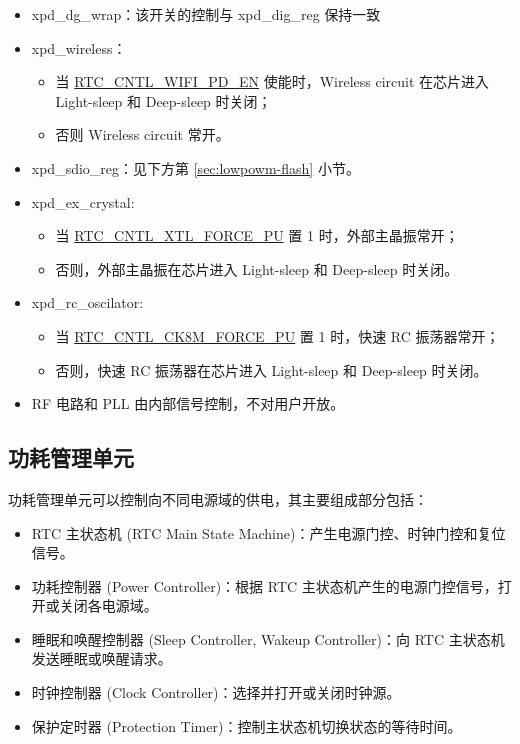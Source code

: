 \documentclass[main\_\_CN.tex]{subfiles}
\begin{document}
\begin{itemize}
\begin{itemize}
        \item xpd\_dg\_wrap：该开关的控制与 xpd\_dig\_reg 保持一致

        \item xpd\_wireless：
        \begin{itemize}
            \item 当 \hyperref[fielddesc:RTCCNTLDGWRAPPDEN]{RTC\_CNTL\_WIFI\_PD\_EN} 使能时，Wireless circuit 在芯片进入 Light-sleep 和 Deep-sleep 时关闭；
            \item 否则 Wireless circuit 常开。
        \end{itemize}

        \item xpd\_sdio\_reg：见下方第 \ref{sec:lowpowm-flash} 小节。
         \item xpd\_ex\_crystal:
        \begin{itemize}
            \item 当 \hyperref[fielddesc:RTCCNTLXTLFORCEPU]{RTC\_CNTL\_XTL\_FORCE\_PU} 置 1 时，外部主晶振常开；
            \item 否则，外部主晶振在芯片进入 Light-sleep 和 Deep-sleep 时关闭。
        \end{itemize}
        \item xpd\_rc\_oscilator:
        \begin{itemize}
            \item 当 \hyperref[fielddesc:RTCCNTLCK8MFORCEPU]{RTC\_CNTL\_CK8M\_FORCE\_PU} 置 1 时，快速 RC 振荡器常开；
            \item 否则，快速 RC 振荡器在芯片进入 Light-sleep 和 Deep-sleep 时关闭。
        \end{itemize}
        \item RF 电路和 PLL 由内部信号控制，不对用户开放。
        \end{itemize}
\end{itemize}

\subsection{功耗管理单元}
\chipname{} 功耗管理单元可以控制向不同电源域的供电，其主要组成部分包括：

\begin{itemize}
\item RTC 主状态机 (RTC Main State Machine)：产生电源门控、时钟门控和复位信号。
\item 功耗控制器 (Power Controller)：根据 RTC 主状态机产生的电源门控信号，打开或关闭各电源域。
\item 睡眠和唤醒控制器 (Sleep Controller, Wakeup Controller)：向 RTC 主状态机发送睡眠或唤醒请求。
\item 时钟控制器 (Clock Controller)：选择并打开或关闭时钟源。
\item 保护定时器 (Protection Timer)：控制主状态机切换状态的等待时间。
\end{itemize}
\end{document}
